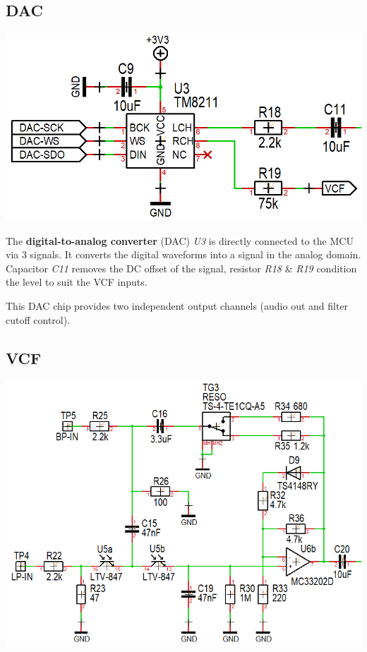 \documentclass{scrartcl}
\begin{document}
\subsection{DAC}

\begin{center}
    \includegraphics[scale=0.30]{assets/schema-dac.png}
\end{center}

The \textbf{digital-to-analog converter} (DAC) \emph{U3} is directly connected to the MCU via 3 signals. It converts the digital waveforms into a signal in the analog domain. Capacitor \emph{C11} removes the DC offset of the signal, resistor \emph{R18} \& \emph{R19} condition the level to suit the VCF inputs.

This DAC chip provides two independent output channels (audio out and filter cutoff control).

\subsection{VCF}

\begin{center}
    \includegraphics[scale=0.50]{assets/schema-vcf.png}
\end{center}
\end{document}
